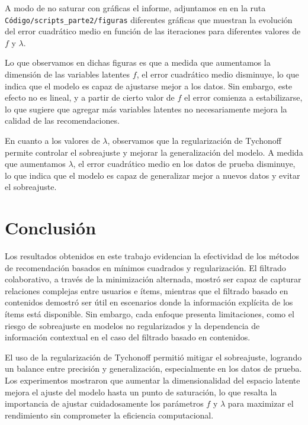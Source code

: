 \documentclass[12pt,a4paper]{article}
\begin{document}
A modo de no saturar con gráficas el informe, adjuntamos en \cite{repoGithub} en la ruta\\ \texttt{Código/scripts\_parte2/figuras} diferentes gráficas que muestran la evolución del error cuadrático medio en función de las iteraciones para diferentes valores de \( f \) y \( \lambda \).	

Lo que observamos en dichas figuras es que a medida que aumentamos la dimensión de las variables latentes \( f \), el error cuadrático medio disminuye, lo que indica que el modelo es capaz de ajustarse mejor a los datos. Sin embargo, este efecto no es lineal, y a partir de cierto valor de \( f \) el error comienza a estabilizarse, lo que sugiere que agregar más variables latentes no necesariamente mejora la calidad de las recomendaciones.

En cuanto a los valores de \( \lambda \), observamos que la regularización de Tychonoff permite controlar el sobreajuste y mejorar la generalización del modelo. A medida que aumentamos \( \lambda \), el error cuadrático medio en los datos de prueba disminuye, lo que indica que el modelo es capaz de generalizar mejor a nuevos datos y evitar el sobreajuste.


\section*{Conclusión}

Los resultados obtenidos en este trabajo evidencian la efectividad de los métodos de recomendación basados en mínimos cuadrados y regularización. El filtrado colaborativo, a través de la minimización alternada, mostró ser capaz de capturar relaciones complejas entre usuarios e ítems, mientras que el filtrado basado en contenidos demostró ser útil en escenarios donde la información explícita de los ítems está disponible. Sin embargo, cada enfoque presenta limitaciones, como el riesgo de sobreajuste en modelos no regularizados y la dependencia de información contextual en el caso del filtrado basado en contenidos.

El uso de la regularización de Tychonoff permitió mitigar el sobreajuste, logrando un balance entre precisión y generalización, especialmente en los datos de prueba. Los experimentos mostraron que aumentar la dimensionalidad del espacio latente mejora el ajuste del modelo hasta un punto de saturación, lo que resalta la importancia de ajustar cuidadosamente los parámetros \(f\) y \(\lambda\) para maximizar el rendimiento sin comprometer la eficiencia computacional.
\end{document}
